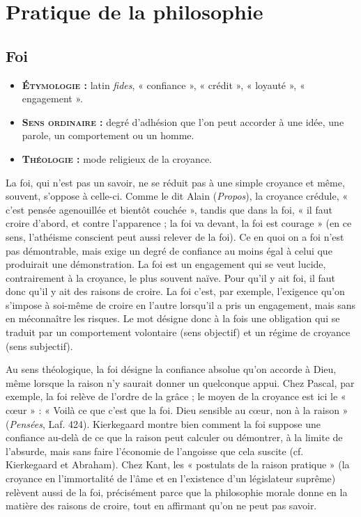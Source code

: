 
\section{Pratique de la philosophie}

\subsection{Foi}
{\footnotesize
\begin{itemize}[leftmargin=1cm, label=, itemsep=1pt]
\item {\bf \textsc{Étymologie} :} latin {\it fides},
« confiance », « crédit », « loyauté »,
« engagement ».
\item {\bf \textsc{Sens ordinaire} :} degré d'adhésion que l'on peut
accorder à une idée, une parole, un
comportement ou un homme.
\item {\bf \textsc{Théologie} :} mode religieux de la
croyance.
\end{itemize}
}

La foi, qui n’est pas un savoir, ne se
réduit pas à une simple croyance et
même, souvent, s'oppose à celle-ci.
Comme le dit Alain ({\it Propos}), la
croyance crédule, « c’est pensée agenouillée
et bientôt couchée », tandis
que dans la foi, « il faut croire d’abord,
et contre l’apparence ; la foi va devant,
la foi est courage » (en ce sens,
l’athéisme conscient peut aussi relever
de la foi). Ce en quoi on a foi n’est pas
démontrable, mais exige un degré de
confiance au moins égal à celui que
produirait une démonstration. La foi est
un engagement qui se veut lucide,
contrairement à la croyance, le plus
souvent naïve. Pour qu'il y ait foi, il
faut donc qu'il y ait des raisons de
croire. La foi c’est, par exemple, l’exigence
qu'on s'impose à soi-même de
croire en l'autre lorsqu'il a pris un
engagement, mais sans en méconnaître
les risques. Le mot désigne donc à la
fois une obligation qui se traduit par
un comportement volontaire (sens
objectif) et un régime de croyance
(sens subjectif).

Au sens théologique, la foi désigne la
confiance absolue qu'on accorde à
Dieu, même lorsque la raison n'y saurait
donner un quelconque appui. Chez
Pascal, par exemple, la foi relève de
l'ordre de la grâce ; le moyen de la
croyance est ici le « cœur » : « Voilà ce
que c’est que la foi. Dieu sensible au
cœur, non à la raison » ({\it Pensées}, Laf.
424). Kierkegaard montre bien
comment la foi suppose une confiance
au-delà de ce que la raison peut calculer
ou démontrer, à la limite de
l’absurde, mais sans faire l’économie
de l’angoisse que cela suscite (cf. Kierkegaard
et Abraham). Chez Kant, les
« postulats de la raison pratique » (la
croyance en l'immortalité de l'âme et
en l'existence d'un législateur
suprême) relèvent aussi de la foi, précisément
parce que la philosophie
morale donne en la matière des raisons
de croire, tout en affirmant qu’on ne
peut pas savoir.

